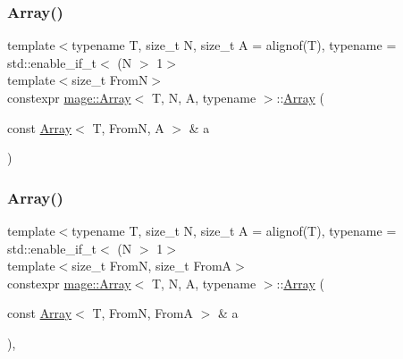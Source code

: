\subsubsection{\texorpdfstring{Array()}{Array()}\hspace{0.1cm}{\footnotesize\ttfamily [4/10]}}
{\footnotesize\ttfamily template$<$typename T, size\+\_\+t N, size\+\_\+t A = alignof(\+T), typename  = std\+::enable\+\_\+if\+\_\+t$<$ (\+N $>$ 1$>$ \\
template$<$size\+\_\+t FromN$>$ \\
constexpr \mbox{\hyperlink{structmage_1_1_array}{mage\+::\+Array}}$<$ T, N, A, typename $>$\+::\mbox{\hyperlink{structmage_1_1_array}{Array}} (\begin{DoxyParamCaption}\item[{const \mbox{\hyperlink{structmage_1_1_array}{Array}}$<$ T, FromN, A $>$ \&}]{a }\end{DoxyParamCaption})\hspace{0.3cm}{\ttfamily [noexcept]}}

\mbox{\label{structmage_1_1_array_ac747c6b1fad2e919e3370cbe6b2937f5}} 
\subsubsection{\texorpdfstring{Array()}{Array()}\hspace{0.1cm}{\footnotesize\ttfamily [5/10]}}
{\footnotesize\ttfamily template$<$typename T, size\+\_\+t N, size\+\_\+t A = alignof(\+T), typename  = std\+::enable\+\_\+if\+\_\+t$<$ (\+N $>$ 1$>$ \\
template$<$size\+\_\+t FromN, size\+\_\+t FromA$>$ \\
constexpr \mbox{\hyperlink{structmage_1_1_array}{mage\+::\+Array}}$<$ T, N, A, typename $>$\+::\mbox{\hyperlink{structmage_1_1_array}{Array}} (\begin{DoxyParamCaption}\item[{const \mbox{\hyperlink{structmage_1_1_array}{Array}}$<$ T, FromN, FromA $>$ \&}]{a }\end{DoxyParamCaption})\hspace{0.3cm}{\ttfamily [explicit]}, {\ttfamily [noexcept]}}

\mbox{\label{structmage_1_1_array_a128de416259f75f7b4ab8ab2e1ba9bd7}} 
